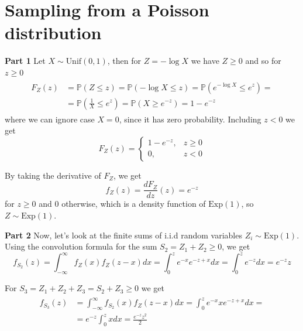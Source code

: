 \documentclass[12pt]{article}
\begin{document}
\section*{Sampling from a Poisson distribution}

\setcounter{equation}{0}
\noindent \textbf{Part 1} Let $X \sim \text{Unif}(0, 1)$, then for $Z = -\log X$ we have $Z \geq 0$ and so for $z \geq 0$
\begin{align}
\begin{split}
    F_Z(z) &= \mathbb{P}(Z \leq z) = \mathbb{P}(-\log X \leq z) = \mathbb{P}(e^{-\log X} \leq e^{z}) =\\
    &= \mathbb{P}\left(\frac{1}{X} \leq e^{z}\right) = \mathbb{P}(X \geq e^{-z}) = 1 - e^{-z}
\end{split}
\end{align}
where we can ignore case $X = 0$, since it has zero probability. Including $z < 0$ we get  
\begin{equation}
    F_Z(z) = \begin{cases}
        1 - e^{-z}, &z \geq 0 \\
        0, &z < 0
    \end{cases}
\end{equation}

By taking the derivative of $F_Z$, we get 
\begin{equation}
    f_Z(z) = \frac{dF_Z}{dz} (z) = e^{-z}
\end{equation}
for $z \geq 0$ and $0$ otherwise, which is a density function of $\text{Exp}(1)$, so $Z \sim \text{Exp}(1)$.

\noindent \textbf{Part 2} Now, let's look at the finite sums of i.i.d random variables $Z_i \sim \text{Exp}(1)$. Using the convolution formula for the sum $S_2 = Z_1 + Z_2 \geq 0$, we get
\begin{equation}
    f_{S_2}(z) = \int_{-\infty}^{\infty}{f_{Z}(x) f_Z(z-x) dx} = \int_{0}^{z}{e^{-x}e^{-z+x}dx} = \int_{0}^{z}{e^{-z}dx} = e^{-z} z
\end{equation}

For $S_3 = Z_1 + Z_2 + Z_3 = S_2 + Z_3 \geq 0$ we get 
\begin{align}
\begin{split}
    f_{S_3}(z) &= \int_{-\infty}^{\infty}{f_{S_2}(x) f_Z(z-x) dx} = \int_{0}^{z}{e^{-x} x e^{-z+x}dx} = \\
    &=  e^{-z} \int_{0}^{z}{ x dx} = \frac{e^{-z} z^2}{2}
\end{split}
\end{align}
\end{document}
